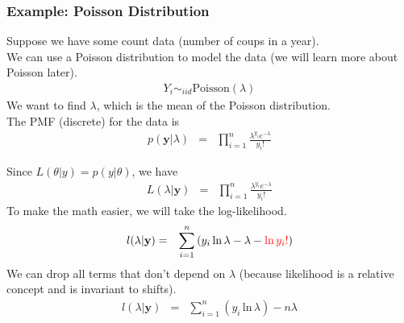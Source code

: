 \documentclass[handout]{beamer}
\begin{document}
\begin{frame}
\frametitle{Example: Poisson Distribution}
Suppose we have some count data (number of coups in a year). \\
\pause 
\bigskip
We can use a Poisson distribution to model the data (we will learn more about
Poisson later).
\pause
\begin{eqnarray*}
Y_i \sim_{iid} \mathrm{Poisson}(\lambda)
\end{eqnarray*}
\pause
We want to find $\lambda$, which is the mean of the Poisson
distribution.\\ \pause 
\bigskip
The PMF (discrete) for the data is
\begin{eqnarray*}
p(\mathbf{y} | \lambda) &=& \prod_{i=1}^n \frac{\lambda^{y_i} e^{-\lambda}}{y_i!}
\end{eqnarray*}
\end{frame}

\begin{frame}
Since $L(\theta | y) = p(y | \theta)$, we have
\begin{eqnarray*}
L(\lambda | \mathbf{y}) &=& \prod_{i=1}^n \frac{\lambda^{y_i} e^{-\lambda}}{y_i!}
\end{eqnarray*}
\pause
To make the math easier, we will take the log-likelihood.
\pause
\begin{eqnarray*}
l(\lambda | \mathbf{y}) &=& \sum_{i=1}^n \left( y_i \, \mathrm{ln} \, \lambda
- \lambda - \textcolor{red}{\mathrm{ln} \, y_i!} \right)
\end{eqnarray*}
\pause
We can drop all terms that don't depend on $\lambda$ (because
likelihood is a relative concept and is invariant to shifts).
\pause
\begin{eqnarray*}
l(\lambda | \mathbf{y}) &=& \sum_{i=1}^n (y_i \, \mathrm{ln} \, \lambda)
- n\lambda 
\end{eqnarray*}
\end{frame}
\end{document}
